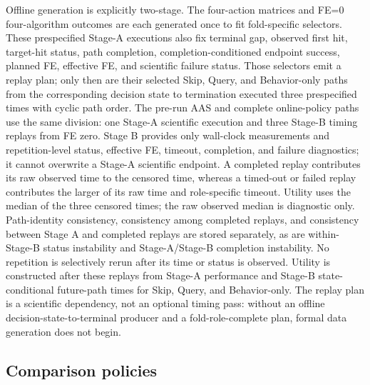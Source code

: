 Offline generation is explicitly two-stage.  The four-action matrices and
FE=0 four-algorithm outcomes are each generated once to fit fold-specific
selectors.  These prespecified Stage-A executions also fix terminal gap,
observed first hit, target-hit status, path completion,
completion-conditioned endpoint success, planned FE, effective FE, and
scientific failure status.
Those selectors emit a replay plan; only then are their selected
Skip, Query, and Behavior-only paths from the corresponding decision state to
termination executed three prespecified times with cyclic path order.  The
pre-run AAS and complete online-policy paths use the same division: one Stage-A
scientific execution and three Stage-B timing replays from FE zero.  Stage B
provides only wall-clock measurements and repetition-level status, effective
FE, timeout, completion, and failure diagnostics; it cannot overwrite a
Stage-A scientific endpoint.  A completed replay contributes its raw observed
time to the censored time, whereas a timed-out or failed replay contributes the
larger of its raw time and role-specific timeout.  Utility uses the median of
the three censored times; the raw observed median is diagnostic only.
Path-identity consistency, consistency among completed replays, and consistency
between Stage A and completed replays are stored separately, as are within-Stage-B
status instability and Stage-A/Stage-B completion instability.  No repetition
is selectively rerun after its time or status is observed.  Utility
is constructed after these replays from Stage-A performance and Stage-B
state-conditional future-path times for Skip, Query, and Behavior-only.  The
replay plan is a scientific dependency, not an optional timing pass: without an
offline decision-state-to-terminal producer and a fold-role-complete plan,
formal data generation does not begin.

\subsection{Comparison policies}

